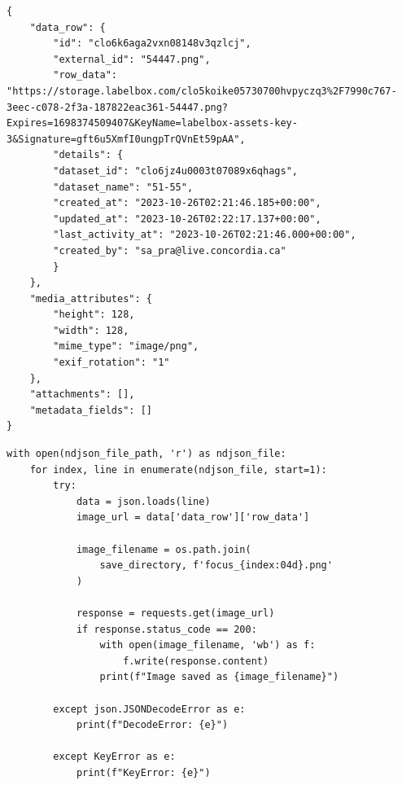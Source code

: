 \begin{lstlisting}[style=json, caption={Sample .ndjson after exporting some filtered images using Labelbox \cite{Labelbox} Slice \cite{LabelboxSlice}}]
{
    "data_row": {
        "id": "clo6k6aga2vxn08148v3qzlcj",
        "external_id": "54447.png",
        "row_data": "https://storage.labelbox.com/clo5koike05730700hvpyczq3%2F7990c767-3eec-c078-2f3a-187822eac361-54447.png?Expires=1698374509407&KeyName=labelbox-assets-key-3&Signature=gft6u5XmfI0ungpTrQVnEt59pAA",
        "details": {
        "dataset_id": "clo6jz4u0003t07089x6qhags",
        "dataset_name": "51-55",
        "created_at": "2023-10-26T02:21:46.185+00:00",
        "updated_at": "2023-10-26T02:22:17.137+00:00",
        "last_activity_at": "2023-10-26T02:21:46.000+00:00",
        "created_by": "sa_pra@live.concordia.ca"
        }
    },
    "media_attributes": {
        "height": 128,
        "width": 128,
        "mime_type": "image/png",
        "exif_rotation": "1"
    },
    "attachments": [],
    "metadata_fields": []
}      
\end{lstlisting}
\vspace*{1em}

\lstset{
  language=Python,
  basicstyle=\ttfamily,
  numbers=left,
  frame=single,
  captionpos=b,
}

\begin{lstlisting}[caption={Consolidating the images}]
with open(ndjson_file_path, 'r') as ndjson_file:
    for index, line in enumerate(ndjson_file, start=1):
        try:
            data = json.loads(line)
            image_url = data['data_row']['row_data']

            image_filename = os.path.join(
                save_directory, f'focus_{index:04d}.png'
            )

            response = requests.get(image_url)
            if response.status_code == 200:
                with open(image_filename, 'wb') as f:
                    f.write(response.content)
                print(f"Image saved as {image_filename}")
        
        except json.JSONDecodeError as e:
            print(f"DecodeError: {e}")
        
        except KeyError as e:
            print(f"KeyError: {e}")
\end{lstlisting}


